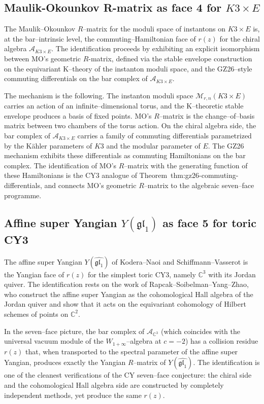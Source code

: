 \documentclass[11pt]{article}
\newcommand{\cA}{\mathcal{A}}
\newcommand{\C}{\mathbb{C}}
\begin{document}
\subsection{Maulik-Okounkov R-matrix as face 4 for $K3 \times E$}

The Maulik--Okounkov $R$--matrix for the moduli space of instantons on
$K3 \times E$ is, at the bar--intrinsic level, the commuting--Hamiltonian
face of $r(z)$ for the chiral algebra $\cA_{K3 \times E}$. The
identification proceeds by exhibiting an explicit isomorphism between MO's
geometric $R$-matrix, defined via the stable envelope construction on
the equivariant K--theory of the instanton moduli space, and the
GZ26--style commuting differentials on the bar complex of
$\cA_{K3 \times E}$.

The mechanism is the following. The instanton moduli space
$\mathcal{M}_{r,n}(K3 \times E)$ carries an action of an infinite--dimensional
torus, and the K--theoretic stable envelope produces a basis of fixed
points. MO's $R$--matrix is the change--of--basis matrix between two
chambers of the torus action. On the chiral algebra side, the bar complex
of $\cA_{K3 \times E}$ carries a family of commuting differentials parametrized
by the K\"ahler parameters of $K3$ and the modular parameter of $E$. The
GZ26 mechanism exhibits these differentials as commuting Hamiltonians on
the bar complex. The identification of MO's $R$--matrix with the
generating function of these Hamiltonians is the CY3 analogue of
Theorem~\textup{thm:gz26-commuting-differentials}, and connects MO's
geometric $R$--matrix to the algebraic seven--face programme.

\subsection{Affine super Yangian $Y(\mathfrak{gl}_1)$ as face 5 for toric CY3}

The affine super Yangian $Y(\widehat{\mathfrak{gl}_1})$ of Kodera--Naoi and
Schiffmann--Vasserot is the Yangian face of $r(z)$ for the simplest toric
CY3, namely $\C^3$ with its Jordan quiver. The identification rests on
the work of Rapcak--Soibelman--Yang--Zhao, who construct the affine super
Yangian as the cohomological Hall algebra of the Jordan quiver and show
that it acts on the equivariant cohomology of Hilbert schemes of points on
$\C^2$.

In the seven--face picture, the bar complex of $\cA_{\C^3}$ (which
coincides with the universal vacuum module of the
$W_{1+\infty}$--algebra at $c = -2$) has a collision residue $r(z)$ that,
when transported to the spectral parameter of the affine super Yangian,
produces exactly the Yangian $R$--matrix of $Y(\widehat{\mathfrak{gl}_1})$.
The identification is one of the cleanest verifications of the CY
seven--face conjecture: the chiral side and the cohomological Hall algebra
side are constructed by completely independent methods, yet produce the
same $r(z)$.
\end{document}
